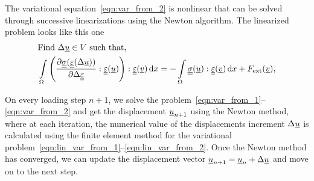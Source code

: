 \documentclass[12pt]{article}
\newcommand{\todounderline}[1]{\todo[inline, size=\scriptsize]{#1}}
\begin{document}
The variational equation~\eqref{eqn:var_from_2} is nonlinear that can be solved through successive linearizations using the
Newton algorithm. The linearized problem looks like this one
\begin{align}
    & \text{Find } \Delta\underline{u} \in V \text{ such that,} \label{eqn:lin_var_from_1} \\ 
    & \int\limits_\Omega \left(\frac{\partial\underline{\underline{\sigma}}(\underline{\underline{\varepsilon}}(\Delta\underline{u}))}{\partial\Delta\underline{\underline{\varepsilon}}} : \underline{\underline{\varepsilon}}(\underline{u})\right) : \underline{\underline{\varepsilon}}(\underline{v}) \, \mathrm{d} x = -\int\limits_\Omega\underline{\underline{\sigma}}(\underline{u}) : \underline{\underline{\varepsilon}}(\underline{v}) \, \mathrm{d} x + F_\text{ext}(\underline{v}) \label{eqn:lin_var_from_2},
\end{align}

On every loading step $n+1$, we solve the problem~\eqref{eqn:var_from_1}--\eqref{eqn:var_from_2} and get the displacement $\underline{u}_{n+1}$ using the Newton method, where at each iteration, the numerical value of the displacements increment $\Delta\underline{u}$ is calculated using the finite element method for the variational problem~\eqref{eqn:lin_var_from_1}--\eqref{eqn:lin_var_from_2}. Once the Newton method has converged, we can update the displacement vector $\underline{u}_{n+1} = \underline{u}_n + \Delta\underline{u}$ and move on to the next step. 
\end{document}

